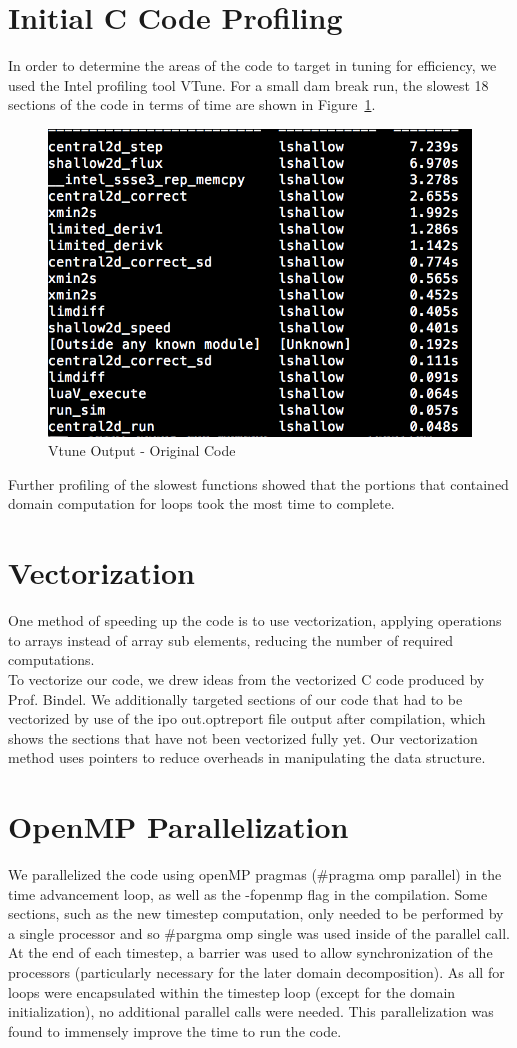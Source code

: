 \documentclass{article}
\begin{document}
\clearpage
\section{Initial C Code Profiling}

In order to determine the areas of the code to target in tuning for efficiency, we used the Intel profiling tool VTune. For a small dam break run, the slowest 18 sections of the code in terms of time are shown in Figure~\ref{v_orig}. 
 
\begin{figure}[here]
 \centering
 \includegraphics[width=0.4\linewidth]{VTUNE_OrigC.png}
 \caption{Vtune Output - Original Code}
 \label{v_orig}
\end{figure}

Further profiling of the slowest functions showed that the portions that contained domain computation for loops took the most time to complete. 

\section{Vectorization}
One method of speeding up the code is to use vectorization, applying operations to arrays instead of array sub elements, reducing the number of required computations. \\

To vectorize our code, we drew ideas from the vectorized C code produced by Prof. Bindel. We additionally targeted sections of our code that had to be vectorized by use of the ipo out.optreport file output after compilation, which shows the sections that have not been vectorized fully yet. Our vectorization method uses pointers to reduce overheads in manipulating the data structure. 

\section{OpenMP Parallelization}
We parallelized the code using openMP pragmas (\#pragma omp parallel) in the time advancement loop, as well as the -fopenmp flag in the compilation. Some sections, such as the new timestep computation, only needed to be performed by a single processor and so \#pargma omp single was used inside of the parallel call. At the end of each timestep, a barrier was used to allow synchronization of the processors (particularly necessary for the later domain decomposition). As all for loops were encapsulated within the timestep loop (except for the domain initialization), no additional parallel calls were needed. This parallelization was found to immensely improve the time to run the code. \\
\end{document}
